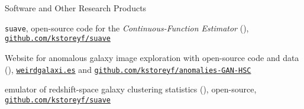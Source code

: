 \begin{cvlist_tight}{Software and Other Research Products}
\item[2020] \texttt{suave}, open-source code for the \emph{Continuous-Function Estimator} (), \\ \href{http://www.github.com/kstoreyf/suave}{\texttt{github.com/kstoreyf/suave}}
\item[2021] Website for anomalous galaxy image exploration with open-source code and data (), \href{https://weirdgalaxi.es}{\texttt{weirdgalaxi.es}} and \href{https://github.com/kstoreyf/anomalies-GAN-HSC}{\texttt{github.com/kstoreyf/anomalies-GAN-HSC}}
\item[2022] emulator of redshift-space galaxy clustering statistics (), open-source, \href{http://www.github.com/kstoreyf/aemulator}{\texttt{github.com/kstoreyf/suave}}
\end{cvlist_tight}